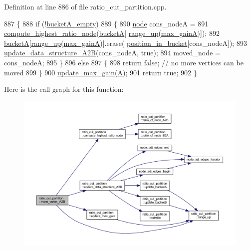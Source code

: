 Definition at line 886 of file ratio\+\_\+cut\+\_\+partition.\+cpp.


\begin{DoxyCode}
887 \{
888     \textcolor{keywordflow}{if} (!\mbox{\hyperlink{classratio__cut__partition_a2e3f25066f798f28e9e5646f866ffc1c}{bucketA\_empty}})
889     \{
890     \mbox{\hyperlink{classnode}{node}} cons\_nodeA =
891         \mbox{\hyperlink{classratio__cut__partition_a11bd0644238997c99e7035507c709e50}{compute\_highest\_ratio\_node}}(\mbox{\hyperlink{classratio__cut__partition_ac9c2f4f99e1042d69f44c1a1f79d4a2f}{bucketA}}[
      \mbox{\hyperlink{classratio__cut__partition_a5cda26b908793b59881798d88b07344c}{range\_up}}(\mbox{\hyperlink{classratio__cut__partition_ae69ef6876be68d5752d247564a524c6a}{max\_gainA}})]);
892     \mbox{\hyperlink{classratio__cut__partition_ac9c2f4f99e1042d69f44c1a1f79d4a2f}{bucketA}}[\mbox{\hyperlink{classratio__cut__partition_a5cda26b908793b59881798d88b07344c}{range\_up}}(\mbox{\hyperlink{classratio__cut__partition_ae69ef6876be68d5752d247564a524c6a}{max\_gainA}})].erase(
      \mbox{\hyperlink{classratio__cut__partition_a871af9a7ed4cb1c101e6620ff99cb8d7}{position\_in\_bucket}}[cons\_nodeA]);
893     \mbox{\hyperlink{classratio__cut__partition_acdb4b69b6c94f06f6997ccec296a281f}{update\_data\_structure\_A2B}}(cons\_nodeA, \textcolor{keyword}{true});
894     moved\_node = cons\_nodeA;
895     \}
896     \textcolor{keywordflow}{else}
897     \{
898     \textcolor{keywordflow}{return} \textcolor{keyword}{false};   \textcolor{comment}{// no more vertices can be moved}
899     \}
900     \mbox{\hyperlink{classratio__cut__partition_afbe33417996a8e040d4d802a1116e134}{update\_max\_gain}}(\mbox{\hyperlink{classratio__cut__partition_a9c0da5ad845b01bddbc1f238fa35cdd0}{A}});
901     \textcolor{keywordflow}{return} \textcolor{keyword}{true};
902 \}
\end{DoxyCode}
Here is the call graph for this function\+:\nopagebreak
\begin{figure}[H]
\begin{center}
\leavevmode
\includegraphics[width=350pt]{classratio__cut__partition_a8988d72cd456e79243f0e1c1b03ed501_cgraph}
\end{center}
\end{figure}
